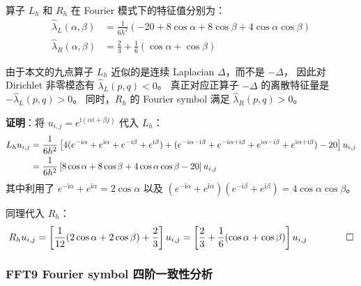 \begin{lemma}
  \label{lem:fourier_eigenvalues}
  算子 $L_h$ 和 $R_h$ 在 Fourier 模式下的特征值分别为：
  \begin{align}
    \hat{\lambda}_L(\alpha,\beta) &= \frac{1}{6h^2}(-20 + 8\cos\alpha + 8\cos\beta + 4\cos\alpha\cos\beta)
    \label{eq:lam_L} \\
    \hat{\lambda}_R(\alpha,\beta) &= \frac{2}{3} + \frac{1}{6}(\cos\alpha + \cos\beta)
    \label{eq:lam_R}
  \end{align}

  由于本文的九点算子 $L_h$ 近似的是连续 Laplacian $\Delta$，而不是 $-\Delta$，
  因此对 Dirichlet 非零模态有 $\hat{\lambda}_L(p,q)<0$。
  真正对应正算子 $-\Delta$ 的离散特征量是 $-\hat{\lambda}_L(p,q)>0$。
  同时，$R_h$ 的 Fourier symbol 满足 $\hat{\lambda}_R(p,q)>0$。

  \textbf{证明}：将 $u_{i,j} = e^{\mathrm{i}(\alpha i + \beta j)}$ 代入 $L_h$：
  \begin{align}
    L_h u_{i,j} &= \frac{1}{6h^2}\left[4(e^{-\mathrm{i}\alpha}+e^{\mathrm{i}\alpha}+e^{-\mathrm{i}\beta}+e^{\mathrm{i}\beta})
    + (e^{-\mathrm{i}\alpha-\mathrm{i}\beta}+e^{-\mathrm{i}\alpha+\mathrm{i}\beta}+e^{\mathrm{i}\alpha-\mathrm{i}\beta}+e^{\mathrm{i}\alpha+\mathrm{i}\beta})
    - 20\right] u_{i,j} \notag \\
    &= \frac{1}{6h^2}\left[8\cos\alpha + 8\cos\beta + 4\cos\alpha\cos\beta - 20\right] u_{i,j}
  \end{align}
  其中利用了 $e^{-\mathrm{i}\alpha}+e^{\mathrm{i}\alpha} = 2\cos\alpha$ 以及
  $(e^{-\mathrm{i}\alpha}+e^{\mathrm{i}\alpha})(e^{-\mathrm{i}\beta}+e^{\mathrm{i}\beta}) = 4\cos\alpha\cos\beta$。

  同理代入 $R_h$：
  \begin{equation}
    R_h u_{i,j} = \left[\frac{1}{12}(2\cos\alpha + 2\cos\beta) + \frac{2}{3}\right] u_{i,j}
    = \left[\frac{2}{3} + \frac{1}{6}(\cos\alpha + \cos\beta)\right] u_{i,j} \qquad \qed
  \end{equation}
\end{lemma}

\subsubsection{FFT9 Fourier symbol 四阶一致性分析}

